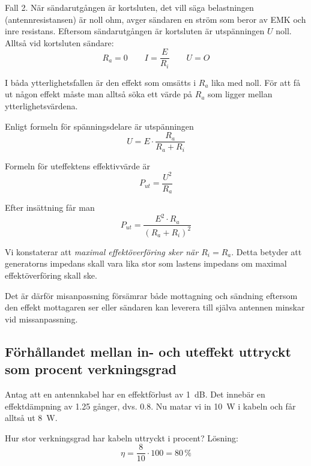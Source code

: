Fall 2.
När sändarutgången är kortsluten, det vill säga belastningen
(antennresistansen) är noll ohm, avger sändaren en ström som beror av EMK och
inre resistans.
Eftersom sändarutgången är kortsluten är utspänningen \(U\) noll.
Alltså vid kortsluten sändare:
\[   R_a = 0 \qquad I = \dfrac{E}{R_i} \qquad U = O	\]

I båda ytterlighetsfallen är den effekt som omsätts i \(R_a\) lika med noll.
För att få ut någon effekt måste man alltså söka ett värde på \(R_a\) som
ligger mellan ytterlighetsvärdena.

Enligt formeln för spänningsdelare är utspänningen
\[   U = E \cdot \dfrac{R_a}{R_a+R_i}	\]

Formeln för uteffektens effektivvärde är
\[   P_{ut} = \dfrac{U^2}{R_a} 	\]

Efter insättning får man
\[   P_{ut} = \dfrac{E^2 \cdot R_a}{(R_a + R_i)^2}   \]


Vi konstaterar att \emph{maximal effektöverföring sker när \(R_i = R_a\)}. 
Detta betyder att generatorns impedans skall vara lika stor som lastens 
impedans om maximal effektöverföring skall ske. 

Det är därför misanpassning försämrar både mottagning och sändning eftersom den 
effekt mottagaren ser eller sändaren kan leverera till själva antennen minskar 
vid missanpassning.

\subsection{Förhållandet mellan in- och uteffekt uttryckt som procent verkningsgrad}

Antag att en antennkabel har en effektförlust av \SI{1}{dB}.
Det innebär en effektdämpning av \num{1,25} gånger, dvs. \num{0,8}.
Nu matar vi in \SI{10}{W} i kabeln och får alltså ut \SI{8}{W}.

Hur stor verkningsgrad har kabeln uttryckt i procent?
Lösning:
\[   \eta = \dfrac{8}{10} \cdot 100 = 80\,\%   \]
